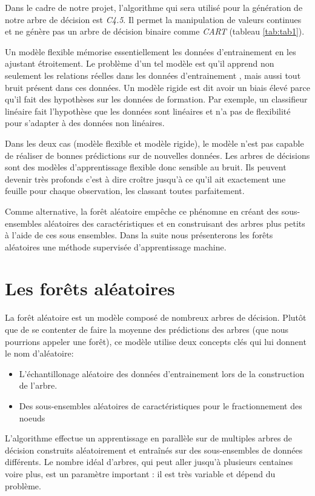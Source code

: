 Dans le cadre de notre projet, l'algorithme qui sera utilisé pour la génération
de notre arbre de décision est \textit{C4.5}. Il permet la manipulation  de
valeurs continues et ne génère pas un arbre de décision binaire comme
\textit{CART} (tableau \ref{tab:tab1}).


Un modèle flexible  mémorise essentiellement les données d'entrainement en
les ajustant étroitement. Le problème d'un tel modèle est qu'il apprend non
seulement les relations réelles dans les données d'entrainement , mais aussi
tout bruit présent dans ces données. Un modèle rigide est dit avoir un biais
élevé parce qu’il fait des hypothèses sur les données de formation. Par
exemple, un classifieur linéaire fait l'hypothèse que les données sont linéaires
et n'a pas de flexibilité pour s'adapter à des données non linéaires.

Dans les deux cas (modèle flexible et modèle rigide), le modèle n'est pas capable de
réaliser de bonnes prédictions sur de nouvelles données.
Les arbres de décisions sont des modèles d'apprentissage flexible donc
sensible au bruit. Ils peuvent devenir très profonds c'est à dire croître
jusqu'à ce qu'il ait exactement une feuille pour chaque observation, les
classant toutes parfaitement.

Comme alternative, la forêt aléatoire empêche ce phénomne en créant des
sous-ensembles aléatoires des caractéristiques et en construisant des arbres plus
petits à l'aide de ces sous ensembles. Dans la suite nous présenterons les
forêts aléatoires une méthode supervisée d'apprentissage machine.

\section{Les forêts aléatoires}

  La forêt aléatoire est un modèle composé de nombreux arbres de décision. Plutôt
  que de se contenter de faire la moyenne des prédictions des arbres (que nous 
  pourrions appeler une \og forêt\fg), ce modèle utilise deux concepts clés qui lui 
  donnent le nom d'aléatoire:
  \begin{itemize}
    \item L'échantillonage aléatoire des données d'entrainement lors de la
      construction de l'arbre.
    \item Des sous-ensembles aléatoires de caractéristiques pour le fractionnement
      des noeuds
  \end{itemize}
  L’algorithme effectue un apprentissage en parallèle sur de multiples arbres
  de décision construits aléatoirement et entraînés sur des sous-ensembles de
  données différents. Le nombre idéal d’arbres, qui peut aller jusqu’à 
  plusieurs centaines voire plus, est un paramètre important : il est très 
  variable et dépend du problème.


